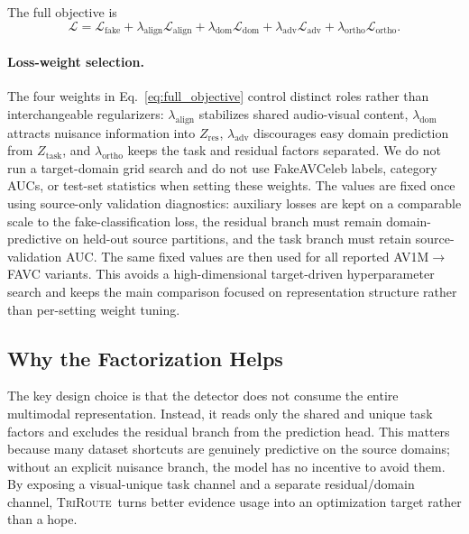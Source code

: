 \documentclass{article}
\newcommand{\method}{\textsc{TriRoute}}
\begin{document}
The full objective is
\begin{equation}
\mathcal{L}
=
\mathcal{L}_{\mathrm{fake}}
+
\lambda_{\mathrm{align}} \mathcal{L}_{\mathrm{align}}
+
\lambda_{\mathrm{dom}} \mathcal{L}_{\mathrm{dom}}
+
\lambda_{\mathrm{adv}} \mathcal{L}_{\mathrm{adv}}
+
\lambda_{\mathrm{ortho}} \mathcal{L}_{\mathrm{ortho}}.
\label{eq:full_objective}
\end{equation}

\paragraph{Loss-weight selection.}
The four weights in Eq.~\eqref{eq:full_objective} control distinct roles rather than interchangeable regularizers: $\lambda_{\mathrm{align}}$ stabilizes shared audio-visual content, $\lambda_{\mathrm{dom}}$ attracts nuisance information into $Z_{\mathrm{res}}$, $\lambda_{\mathrm{adv}}$ discourages easy domain prediction from $Z_{\mathrm{task}}$, and $\lambda_{\mathrm{ortho}}$ keeps the task and residual factors separated. We do not run a target-domain grid search and do not use FakeAVCeleb labels, category AUCs, or test-set statistics when setting these weights. The values are fixed once using source-only validation diagnostics: auxiliary losses are kept on a comparable scale to the fake-classification loss, the residual branch must remain domain-predictive on held-out source partitions, and the task branch must retain source-validation AUC. The same fixed values are then used for all reported AV1M$\rightarrow$FAVC variants. This avoids a high-dimensional target-driven hyperparameter search and keeps the main comparison focused on representation structure rather than per-setting weight tuning.

\subsection{Why the Factorization Helps}

The key design choice is that the detector does not consume the entire multimodal representation. Instead, it reads only the shared and unique task factors and excludes the residual branch from the prediction head. This matters because many dataset shortcuts are genuinely predictive on the source domains; without an explicit nuisance branch, the model has no incentive to avoid them. By exposing a visual-unique task channel and a separate residual/domain channel, \method\ turns better evidence usage into an optimization target rather than a hope.
\end{document}
